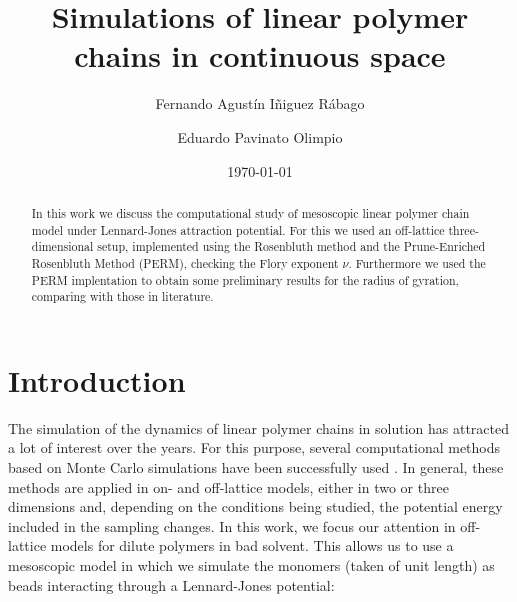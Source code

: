 \documentclass[aps,prl,reprint,groupedaddress]{revtex4-1}
\begin{document}
\title{Simulations of linear polymer chains in continuous space}

\author{Fernando Agust\'in I\~niguez R\'abago}
\author{Eduardo Pavinato Olimpio}


\date{\today}

\begin{abstract}
	In this work we discuss the computational study of mesoscopic linear polymer chain model under Lennard-Jones attraction potential. For this we used an off-lattice three-dimensional setup, implemented using the Rosenbluth method and the Prune-Enriched Rosenbluth Method (PERM), checking the Flory exponent $\nu$. Furthermore we used the PERM implentation to obtain some preliminary results for the radius of gyration, comparing with those in literature.
\end{abstract}

\maketitle

\section{Introduction}
The simulation of the dynamics of linear polymer chains in solution has attracted a lot of interest over the years. For this purpose, several computational methods based on Monte Carlo simulations have been successfully used \cite{mc_polymer_review}. In general, these methods are applied in on- and off-lattice models, either in two or three dimensions and, depending on the conditions being studied, the potential energy included in the sampling changes. In this work, we focus our attention in off-lattice models for dilute polymers in bad solvent. This allows us to use a mesoscopic model in which we simulate the monomers (taken of unit length) as beads interacting through a Lennard-Jones potential:
\end{document}
